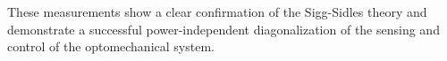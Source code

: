 These measurements show a clear confirmation of the Sigg-Sidles theory
and demonstrate a successful power-independent diagonalization of the
sensing and control of the optomechanical system.












